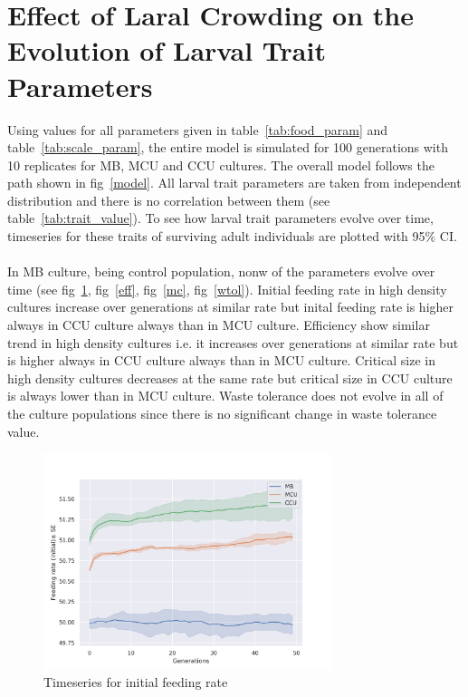 \newpage
\section{Effect of Laral Crowding on the Evolution of Larval Trait Parameters}
Using values for all parameters given in table~\ref{tab:food_param} and table~\ref{tab:scale_param}, the entire model is simulated for 100 generations with 10 replicates for MB, MCU and CCU cultures. The overall model follows the path shown in fig~\ref{model}. All larval trait parameters are taken from independent distribution and there is no correlation between them (see table~\ref{tab:trait_value}). To see how larval trait parameters evolve over time, timeseries for these traits of surviving adult individuals are plotted with 95$\%$ CI.\\ \\
In MB culture, being control population, nonw of the parameters evolve over time (see fig~\ref{fr}, fig~\ref{eff}, fig~\ref{mc}, fig~\ref{wtol}). Initial feeding rate in high density cultures increase over generations at similar rate but inital feeding rate is higher always in CCU culture always than in MCU culture. Efficiency show similar trend in high density cultures i.e. it increases over generations at similar rate but is higher always in CCU culture always than in MCU culture. Critical size in high density cultures decreases at the same rate but critical size in CCU culture is always lower than in MCU culture. Waste tolerance does not evolve in all of the culture populations since there is no significant change in waste tolerance value.
\begin{figure}[h]
  \centering
  \includegraphics[trim = 0 0 50 50, clip, width=0.75\textwidth]{C4/Figs/fr}
  \caption{Timeseries for initial feeding rate}
  \label{fr}
\end{figure}
